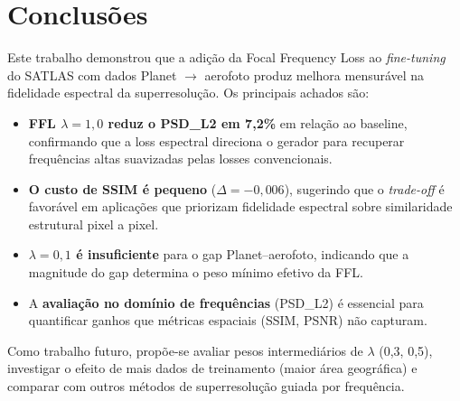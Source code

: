 \documentclass[12pt, a4paper]{article}
\begin{document}
\section{Conclusões}

Este trabalho demonstrou que a adição da Focal Frequency Loss ao \textit{fine-tuning}
do SATLAS com dados Planet $\rightarrow$ aerofoto produz melhora mensurável
na fidelidade espectral da superresolução. Os principais achados são:

\begin{itemize}
    \item \textbf{FFL $\lambda=1{,}0$ reduz o PSD\_L2 em 7{,}2\%} em relação
    ao baseline, confirmando que a loss espectral direciona o gerador para
    recuperar frequências altas suavizadas pelas losses convencionais.

    \item \textbf{O custo de SSIM é pequeno} ($\Delta = -0{,}006$), sugerindo
    que o \textit{trade-off} é favorável em aplicações que priorizam fidelidade
    espectral sobre similaridade estrutural pixel a pixel.

    \item \textbf{$\lambda=0{,}1$ é insuficiente} para o gap Planet--aerofoto,
    indicando que a magnitude do gap determina o peso mínimo efetivo da FFL.

    \item A \textbf{avaliação no domínio de frequências} (PSD\_L2) é essencial
    para quantificar ganhos que métricas espaciais (SSIM, PSNR) não capturam.
\end{itemize}

Como trabalho futuro, propõe-se avaliar pesos intermediários de $\lambda$
(0{,}3, 0{,}5), investigar o efeito de mais dados de treinamento (maior área
geográfica) e comparar com outros métodos de superresolução guiada por frequência.
\end{document}
